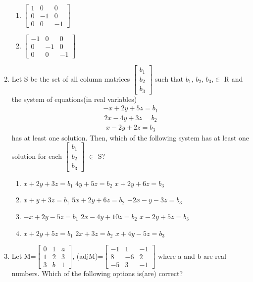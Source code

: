 \begin{enumerate}[label=\arabic*.,ref=\thesubsection.\theenumi]
\begin{enumerate}
 \item $\begin{bmatrix} 1 & 0 & 0  \\ 0 & -1 & 0 \\0 & 0 & -1 \end{bmatrix} $
 \item $\begin{bmatrix} -1 & 0 & 0  \\ 0 & -1 & 0 \\0 & 0 & -1 \end{bmatrix}$
 \end{enumerate}
 \item Let S be the set of all column matrices $\begin{bmatrix} b_1  \\ b_2 \\b_3 \end{bmatrix}$ such that $b_1$, $b_2$, $b_3$,$\in$ R and the system of equations(in real variables) 
 \begin{align} 
 -x+2y+5z=b_1
 \end{align}   
 \begin{align} 
 2x-4y+3z= b_2
 \end{align} 
 \begin{align} 
 x-2y+2z= b_3
 \end{align}  has at least one solution. Then, which of the following system has at least one solution for each $\begin{bmatrix} b_1  \\ b_2 \\b_3 \end{bmatrix}$ $\in$ S?
 \begin{enumerate}
 \item  $x+2y+3z=b_1$  $4y+5z=b_2$  $x+2y+6z=b_3$ 
 \item  $x+y+3z=b_1$  $5x+2y+6z=b_2$  $-2x-y-3z=b_3$ 
 \item  $-x+2y-5z=b_1$ $2x-4y+10z=b_2$  $x-2y+5z=b_3$  
 \item  $x+2y+5z=b_1$ $2x+3z=b_2$  $x+4y-5z=b_3$ 
 \end{enumerate}
 \item Let M=$\begin{bmatrix} 0 & 1 & a  \\ 1 & 2 &3 \\3 & b & 1 \end{bmatrix}$, (adjM)=$\begin{bmatrix} -1 & 1 & -1  \\ 8 & -6 & 2 \\-5 & 3 & -1 \end{bmatrix}$ where a and b are real numbers. Which of the following options is(are) correct?

\end{enumerate}
